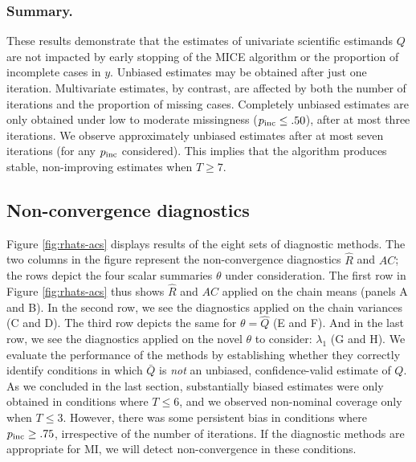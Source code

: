 \documentclass[Royal,times,sageh]{sagej}
\begin{document}
\hypertarget{summary.}{%
\subsubsection{Summary.}\label{summary.}}

These results demonstrate that the estimates of univariate scientific estimands \(Q\) are not impacted by early stopping of the MICE algorithm or the proportion of incomplete cases in \(y\). Unbiased estimates may be obtained after just one iteration. Multivariate estimates, by contrast, are affected by both the number of iterations and the proportion of missing cases. Completely unbiased estimates are only obtained under low to moderate missingness (\(p_{\rm inc}\leq.50\)), after at most three iterations. We observe approximately unbiased estimates after at most seven iterations (for any \(p_{\rm inc}\) considered). This implies that the algorithm produces stable, non-improving estimates when \(T\geq7\).

\hypertarget{non-convergence-diagnostics-1}{%
\subsection{Non-convergence diagnostics}\label{non-convergence-diagnostics-1}}

Figure \ref{fig:rhats-acs} displays results of the eight sets of diagnostic methods. The two columns in the figure represent the non-convergence diagnostics \(\widehat{R}\) and \(AC\); the rows depict the four scalar summaries \(\theta\) under consideration. The first row in Figure \ref{fig:rhats-acs} thus shows \(\widehat{R}\) and \(AC\) applied on the chain means (panels A and B). In the second row, we see the diagnostics applied on the chain variances (C and D). The third row depicts the same for \(\theta=\hat{Q}\) (E and F). And in the last row, we see the diagnostics applied on the novel \(\theta\) to consider: \(\lambda_1\) (G and H). We evaluate the performance of the methods by establishing whether they correctly identify conditions in which \(\bar{Q}\) is \emph{not} an unbiased, confidence-valid estimate of \(Q\). As we concluded in the last section, substantially biased estimates were only obtained in conditions where \(T\leq6\), and we observed non-nominal coverage only when \(T\leq3\). However, there was some persistent bias in conditions where \(p_{\rm inc}\geq.75\), irrespective of the number of iterations. If the diagnostic methods are appropriate for MI, we will detect non-convergence in these conditions.
\end{document}
